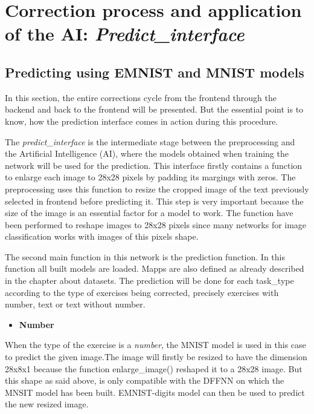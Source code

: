 \author{Bautrelle Fotso}
\graphicspath{ {./src/chapters/developer/media/} }

\section{Correction process and application of the AI: \emph{Predict\_interface}}

\subsection{Predicting using EMNIST and MNIST models}
In this section, the entire corrections cycle from the frontend through the backend and back to the frontend will be presented.
But the essential point is to know, how the prediction interface comes in action during this procedure. 

The \emph{predict\_interface} is the intermediate stage between the preprocessing and the Artificial Intelligence (AI), 
where the models obtained when training the network will be used for the prediction. 
This interface firstly contains a function to enlarge each image to 28x28 pixels 
by padding its margings with zeros. The preprocessing uses this function to resize the cropped image of the text previously selected
in frontend before predicting it. This step is very important because the size of the image is an essential factor for a model to work.
The function have been performed to reshape images to 28x28 pixels since many networks for image classification works with images of this pixels shape.

\noindent
The second main function in this network is the prediction function. In this function all built models are loaded. 
Mapps are also defined as already described in the chapter about datasets. 
The prediction will be done for each task\_type according to the type of exercises being corrected, precisely exercises with number,
text or text without number.

\begin{itemize}
    \item \textbf{Number}
\end{itemize}
When the type of the exercise is a \emph{number}, the MNIST model is used in this case to predict the given image.The image will firstly be 
resized to have the dimension 28x8x1 because the function enlarge\_image() reshaped it to a 28x28 image. But this shape as said above, is only 
compatible with the DFFNN on which the MNSIT model has been built. EMNIST-digits model can then be used to predict the new resized image. 

